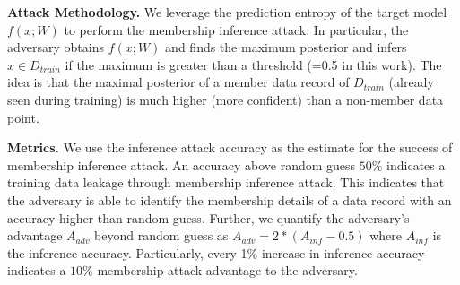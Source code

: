 \noindent\textbf{Attack Methodology.} We leverage the prediction entropy of the target model $f(x;W)$ to perform the membership inference attack.
In particular, the adversary obtains $f(x;W)$ and finds the maximum posterior and infers $x \in D_{train}$ if the maximum is greater than a threshold (=0.5 in this work).
The idea is that the maximal posterior of a member data record of $D_{train}$ (already seen during training) is much higher (more confident) than a non-member data point.

\noindent\textbf{Metrics.} We use the inference attack accuracy as the estimate for the success of membership inference attack.
An accuracy above random guess $50\%$ indicates a training data leakage through membership inference attack.
This indicates that the adversary is able to identify the membership details of a data record with an accuracy higher than random guess.
Further, we quantify the adversary's advantage $A_{adv}$ beyond random guess as $A_{adv} = 2 * (A_{inf}-0.5)$ where $A_{inf}$ is the inference accuracy.
Particularly, every 1\% increase in inference accuracy indicates a $10\%$ membership attack advantage to the adversary.
